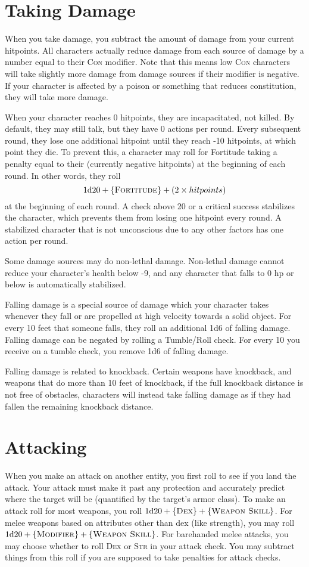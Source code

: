 \section{Taking Damage}
When you take damage, you subtract the amount of damage from your current hitpoints. All characters actually reduce damage from each source of damage by a number equal to their \textsc{Con} modifier. Note that this means low \textsc{Con} characters will take slightly more damage from damage sources if their modifier is negative. If your character is affected by a poison or something that reduces constitution, they will take more damage.

When your character reaches 0 hitpoints, they are incapacitated, not killed. By default, they may still talk, but they have 0 actions per round. Every subsequent round, they lose one additional hitpoint until they reach -10 hitpoints, at which point they die. To prevent this, a character may roll for Fortitude taking a penalty equal to their (currently negative hitpoints) at the beginning of each round. In other words, they roll $$1\mathrm{d}20 + \{ \textsc{Fortitude} \} + (2 \times hitpoints)$$ at the beginning of each round. A check above 20 or a critical success stabilizes the character, which prevents them from losing one hitpoint every round. A stabilized character that is not unconscious due to any other factors has one action per round.

Some damage sources may do non-lethal damage. Non-lethal damage cannot reduce your character’s health below -9, and any character that falls to 0 hp or below is automatically stabilized.

Falling damage is a special source of damage which your character takes whenever they fall or are propelled at high velocity towards a solid object. For every 10 feet that someone falls, they roll an additional 1d6 of falling damage. Falling damage can be negated by rolling a Tumble/Roll check. For every 10 you receive on a tumble check, you remove 1d6 of falling damage.

Falling damage is related to knockback. Certain weapons have knockback, and weapons that do more than 10 feet of knockback, if the full knockback distance is not free of obstacles, characters will instead take falling damage as if they had fallen the remaining knockback distance.

\section{Attacking}
When you make an attack on another entity, you first roll to see if you land the attack. Your attack must make it past any protection and accurately predict where the target will be (quantified by the target’s armor class).
To make an attack roll for most weapons, you roll $1\mathrm{d}20+\{ \textsc{Dex} \}+\{ \textsc{Weapon Skill} \}$. For melee weapons based on attributes other than dex (like strength), you may roll $1\mathrm{d}20+\{ \textsc{Modifier} \}+\{ \textsc{Weapon Skill} \}$. For barehanded melee attacks, you may choose whether to roll \textsc{Dex} or \textsc{Str} in your attack check. You may subtract things from this roll if you are supposed to take penalties for attack checks.

